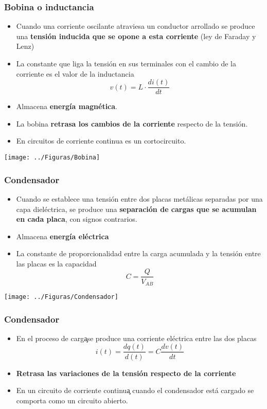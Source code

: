 \documentclass[serif, xcolor=dvipsnames]{beamer}
\begin{document}
\begin{frame}
  \frametitle{Bobina o inductancia}
  \begin{itemize}
  \item Cuando una corriente oscilante atraviesa un conductor
    arrollado se produce una \textbf{tensión inducida que se opone a
      esta corriente} (ley de Faraday y Lenz)
  \item La constante que liga la tensión en sus terminales con el
    cambio de la corriente es el valor de la inductancia
    \[
    v(t)=L\cdot\frac{di(t)}{dt}
    \]

  \item Almacena \textbf{energía magnética}.
  \item La bobina \textbf{retrasa los cambios de la corriente}
    respecto de la tensión.
  \item En circuitos de corriente continua es un cortocircuito.
  \end{itemize}
  \begin{center}
    \texttt{[image: ../Figuras/Bobina]}
    \par\end{center}


\end{frame}
\begin{frame}
  \frametitle{Condensador}
  \begin{itemize}
  \item Cuando se establece una tensión entre dos placas metálicas
    separadas por una capa dieléctrica, se produce una
    \textbf{separación de cargas que se acumulan en cada placa}, con
    signos contrarios.
  \item Almacena \textbf{energía eléctrica}
  \item La constante de proporcionalidad entre la carga acumulada y la
    tensión entre las placas es la capacidad
    \[
    C=\frac{Q}{V_{AB}}
    \]

  \end{itemize}
  \begin{center}
    \texttt{[image: ../Figuras/Condensador]}
    \par\end{center}


\end{frame}
\begin{frame}
  \frametitle{Condensador}
  \begin{itemize}
  \item En el proceso de carga\c{ }se produce una corriente eléctrica
    entre las dos placas
    \[
    i(t)=\frac{dq(t)}{d(t)}=C\frac{dv(t)}{dt}
    \]

  \item \textbf{Retrasa las variaciones de la tensión respecto de la
      corriente}
  \item En un circuito de corriente continua\c{ } cuando el
    condensador está cargado se comporta como un circuito abierto.
  \end{itemize}

\end{frame}
\end{document}
